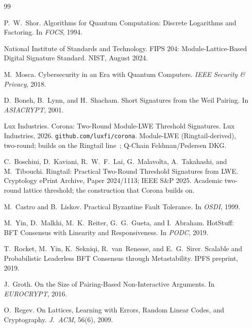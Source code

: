 
\begin{thebibliography}{99}

P.~W.~Shor.
\newblock Algorithms for Quantum Computation: Discrete Logarithms and
  Factoring.
\newblock In \emph{FOCS}, 1994.

{National Institute of Standards and Technology}.
\newblock FIPS 204: Module-Lattice-Based Digital Signature Standard.
\newblock NIST, August 2024.

M.~Mosca.
\newblock Cybersecurity in an Era with Quantum Computers.
\newblock \emph{IEEE Security \& Privacy}, 2018.

D.~Boneh, B.~Lynn, and H.~Shacham.
\newblock Short Signatures from the Weil Pairing.
\newblock In \emph{ASIACRYPT}, 2001.

{Lux Industries}.
\newblock Corona: Two-Round Module-LWE Threshold Signatures.
\newblock Lux Industries, 2026. \texttt{github.com/luxfi/corona}.
\newblock Module-LWE (Ringtail-derived), two-round; builds on the
  Ringtail line~\cite{ringtail}; Q-Chain Feldman/Pedersen DKG.

C.~Boschini, D.~Kaviani, R.~W.~F.~Lai, G.~Malavolta, A.~Takahashi, and
  M.~Tibouchi.
\newblock Ringtail: Practical Two-Round Threshold Signatures from LWE.
\newblock Cryptology ePrint Archive, Paper 2024/1113; IEEE S\&P 2025.
\newblock Academic two-round lattice threshold; the construction that
  Corona builds on.

M.~Castro and B.~Liskov.
\newblock Practical Byzantine Fault Tolerance.
\newblock In \emph{OSDI}, 1999.

M.~Yin, D.~Malkhi, M.~K.~Reiter, G.~G.~Gueta, and I.~Abraham.
\newblock HotStuff: BFT Consensus with Linearity and Responsiveness.
\newblock In \emph{PODC}, 2019.

T.~Rocket, M.~Yin, K.~Sekniqi, R.~van~Renesse, and E.~G.~Sirer.
\newblock Scalable and Probabilistic Leaderless BFT Consensus through
  Metastability.
\newblock IPFS preprint, 2019.

J.~Groth.
\newblock On the Size of Pairing-Based Non-Interactive Arguments.
\newblock In \emph{EUROCRYPT}, 2016.

O.~Regev.
\newblock On Lattices, Learning with Errors, Random Linear Codes, and
  Cryptography.
\newblock \emph{J.\ ACM}, 56(6), 2009.


\end{thebibliography}
